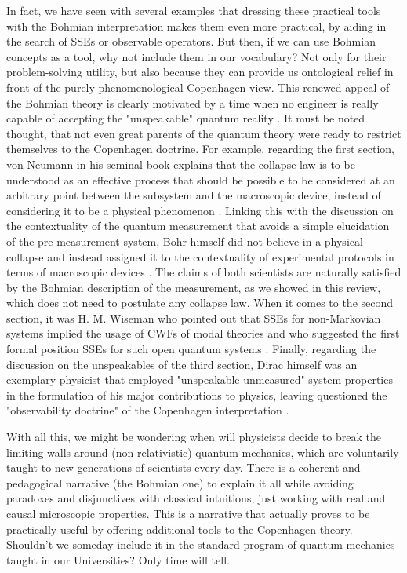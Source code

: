 \documentclass[11pt, a4paper]{article} %
\begin{document}
In fact, we have seen with several examples that dressing these practical tools with the Bohmian interpretation makes them even more practical, by aiding in the search of SSEs or observable operators. But then, if we can use Bohmian concepts as a tool, why not include them in our vocabulary? Not only for their problem-solving utility, but also because they can provide us ontological relief in front of the purely phenomenological Copenhagen view. This renewed appeal of the Bohmian theory is clearly motivated by a time when no engineer is really capable of accepting the "unspeakable" quantum reality \cite{where, consp}. It must be noted thought, that not even great parents of the quantum theory were ready to restrict themselves to the Copenhagen doctrine. For example, regarding the first section, von Neumann in his seminal book \cite{vonNeumann} explains that the collapse law is to be understood as an effective process that should be possible to be considered at an arbitrary point between the subsystem and the macroscopic device, instead of considering it to be a physical phenomenon \cite{NeumannNoCollapse}. Linking this with the discussion on the contextuality of the quantum measurement that avoids a simple elucidation of the pre-measurement system, Bohr himself did not believe in a physical collapse and instead assigned it to the contextuality of experimental protocols \cite{Dirac} in terms of macroscopic devices \cite{Bohr}. The claims of both scientists are naturally satisfied by the Bohmian description of the measurement, as we showed in this review, which does not need to postulate any collapse law. When it comes to the second section, it was H. M. Wiseman who pointed out that SSEs for non-Markovian systems implied the usage of CWFs of modal theories \cite{interpretSSE, NMisModal} and who suggested the first formal position SSEs for such open quantum systems \cite{WisemanSSE}. Finally, regarding the discussion on the unspeakables of the third section, Dirac himself was an exemplary physicist that employed "unspeakable unmeasured" system properties in the formulation of his major contributions to physics, leaving questioned the "observability doctrine" of the Copenhagen interpretation \cite{Dirac}.

With all this, we might be wondering when will physicists decide to break the limiting walls around (non-relativistic) quantum mechanics, which are voluntarily taught to new generations of scientists every day. There is a coherent and pedagogical narrative (the Bohmian one) to explain it all while avoiding paradoxes and disjunctives with classical intuitions, just working with real and causal microscopic properties. This is a narrative that actually proves to be practically useful by offering additional tools to the Copenhagen theory. Shouldn't we someday include it in the standard program of quantum mechanics taught in our Universities? Only time will tell.


{\small



}
\end{document}
